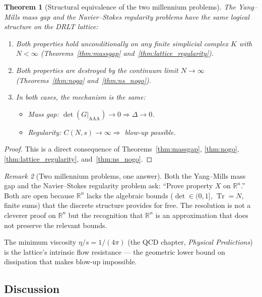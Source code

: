 \documentclass[12pt]{article}
\newtheorem{theorem}{Theorem}[section]
\theoremstyle{remark}
\newtheorem{remark}[theorem]{Remark}
\theoremstyle{definition}
\newcommand{\RR}{\mathbb{R}}
\newcommand{\tr}{\operatorname{Tr}}
\begin{document}
\begin{theorem}[Structural equivalence of the two millennium problems]
\label{thm:structural_equivalence}
The Yang--Mills mass gap and the Navier--Stokes regularity problems
have the same logical structure on the DRLT lattice:
\begin{enumerate}
\item Both properties hold unconditionally on any finite simplicial
  complex $K$ with $N < \infty$
  (Theorems~\ref{thm:massgap} and~\ref{thm:lattice_regularity}).
\item Both properties are destroyed by the continuum limit
  $N \to \infty$
  (Theorems~\ref{thm:nogo} and~\ref{thm:ns_nogo}).
\item In both cases, the mechanism is the same:
  \begin{itemize}
  \item Mass gap: $\det(G|_{\mathrm{AAA}}) \to 0 \Rightarrow
    \Delta \to 0$.
  \item Regularity: $C(N,s) \to \infty \Rightarrow$ blow-up possible.
  \end{itemize}
\end{enumerate}
\end{theorem}

\begin{proof}
This is a direct consequence of Theorems~\ref{thm:massgap},
\ref{thm:nogo}, \ref{thm:lattice_regularity},
and~\ref{thm:ns_nogo}.
\end{proof}

\begin{remark}[Two millennium problems, one answer]
Both the Yang--Mills mass gap and the Navier--Stokes regularity
problem ask: ``Prove property $X$ on $\RR^n$.''  Both are open
because $\RR^n$ lacks the algebraic bounds ($\det \in (0,1]$,
$\tr = N$, finite sums) that the discrete structure provides for free.
The resolution is not a cleverer proof on $\RR^n$ but the recognition
that $\RR^n$ is an approximation that does not preserve the relevant
bounds.

The minimum viscosity $\eta/s = 1/(4\pi)$
(the QCD chapter, \textit{Physical Predictions}) is the lattice's intrinsic flow resistance
--- the geometric lower bound on dissipation that makes blow-up
impossible.
\end{remark}

\subsection{Discussion}
\label{sec:discussion}
\end{document}
